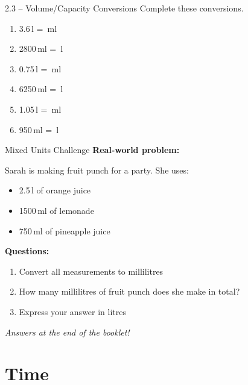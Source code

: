 \documentclass[12pt,a4paper]{article}
\begin{document}
\begin{exercisebox}{2.3 -- Volume/Capacity Conversions}
Complete these conversions.

\begin{enumerate}[leftmargin=*]
\item 3.6\,l = \underline{\hspace{3cm}}\,ml
\item 2800\,ml = \underline{\hspace{3cm}}\,l
\item 0.75\,l = \underline{\hspace{3cm}}\,ml
\item 6250\,ml = \underline{\hspace{3cm}}\,l
\item 1.05\,l = \underline{\hspace{3cm}}\,ml
\item 950\,ml = \underline{\hspace{3cm}}\,l
\end{enumerate}
\end{exercisebox}

\begin{challengebox}{Mixed Units Challenge}
\textbf{Real-world problem:}

Sarah is making fruit punch for a party. She uses:
\begin{itemize}
\item 2.5\,l of orange juice
\item 1500\,ml of lemonade
\item 750\,ml of pineapple juice
\end{itemize}

\textbf{Questions:}
\begin{enumerate}[label=\alph*)]
\item Convert all measurements to millilitres
\item How many millilitres of fruit punch does she make in total?
\item Express your answer in litres
\end{enumerate}

\textit{Answers at the end of the booklet!}
\end{challengebox}

\newpage

\section{Time}
\end{document}
